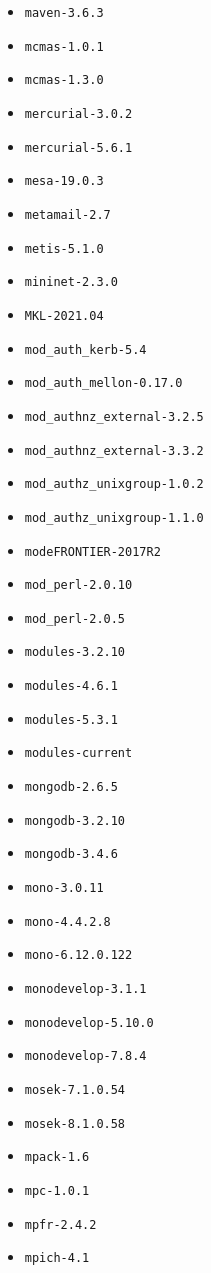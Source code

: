 \begin{multicols}{3}
\begin{itemize}
\item \verb|maven-3.6.3|
\item \verb|mcmas-1.0.1|
\item \verb|mcmas-1.3.0|
\item \verb|mercurial-3.0.2|
\item \verb|mercurial-5.6.1|
\item \verb|mesa-19.0.3|
\item \verb|metamail-2.7|
\item \verb|metis-5.1.0|
\item \verb|mininet-2.3.0|
\item \verb|MKL-2021.04|
\item \verb|mod_auth_kerb-5.4|
\item \verb|mod_auth_mellon-0.17.0|
\item \verb|mod_authnz_external-3.2.5|
\item \verb|mod_authnz_external-3.3.2|
\item \verb|mod_authz_unixgroup-1.0.2|
\item \verb|mod_authz_unixgroup-1.1.0|
\item \verb|modeFRONTIER-2017R2|
\item \verb|mod_perl-2.0.10|
\item \verb|mod_perl-2.0.5|
\item \verb|modules-3.2.10|
\item \verb|modules-4.6.1|
\item \verb|modules-5.3.1|
\item \verb|modules-current|
\item \verb|mongodb-2.6.5|
\item \verb|mongodb-3.2.10|
\item \verb|mongodb-3.4.6|
\item \verb|mono-3.0.11|
\item \verb|mono-4.4.2.8|
\item \verb|mono-6.12.0.122|
\item \verb|monodevelop-3.1.1|
\item \verb|monodevelop-5.10.0|
\item \verb|monodevelop-7.8.4|
\item \verb|mosek-7.1.0.54|
\item \verb|mosek-8.1.0.58|
\item \verb|mpack-1.6|
\item \verb|mpc-1.0.1|
\item \verb|mpfr-2.4.2|
\item \verb|mpich-4.1|

\end{itemize}
\end{multicols}
